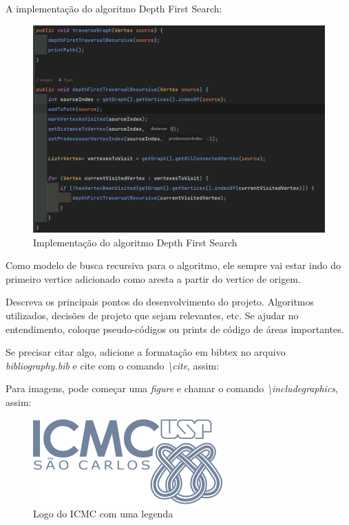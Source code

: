 \documentclass[a4paper, 12pt]{article}
\begin{document}
A implementação do algoritmo Depth First Search: 
\begin{figure}[h!]
\center 
\includegraphics[width=.8\textwidth]{depthFirstTraversalRecursiveMethod.png}
\caption{Implementação do algoritmo Depth First Search}
\end{figure}

Como modelo de busca recursiva para o algoritmo, ele sempre vai estar indo do primeiro vertice adicionado como aresta a partir do vertice de origem.

Descreva os principais pontos do desenvolvimento do projeto. Algoritmos utilizados, decisões de projeto que sejam relevantes, etc.
Se ajudar no entendimento, coloque pseudo-códigos ou prints de código de áreas importantes.

Se precisar citar algo, adicione a formatação em bibtex no arquivo \textit{bibliography.bib} e cite com o comando \textit{\textbackslash cite}, assim: \cite{even2011graph}

Para imagens, pode começar uma \textit{figure} e chamar o comando \textit{\textbackslash includegraphics}, assim:

\begin{figure}[h!]
\center 
\includegraphics[width=.8\textwidth]{logo.png}
\caption{Logo do ICMC com uma legenda}
\end{figure}
\end{document}
